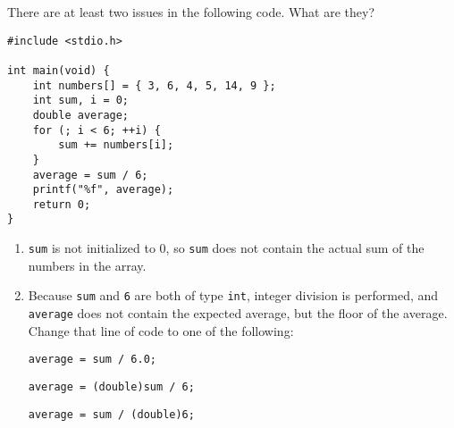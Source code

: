 There are at least two issues in the following code. What are they?

\begin{verbatim}
#include <stdio.h>

int main(void) {
    int numbers[] = { 3, 6, 4, 5, 14, 9 };
    int sum, i = 0;
    double average;
    for (; i < 6; ++i) {
        sum += numbers[i];
    }
    average = sum / 6;
    printf("%f", average);
    return 0;
}
\end{verbatim}

\begin{answer}
\begin{enumerate}
\item \texttt{sum} is not initialized to 0, so \texttt{sum} does not contain the actual sum of the numbers in the array.
\item Because \texttt{sum} and \texttt{6} are both of type \texttt{int}, integer division is performed, and \texttt{average} does not contain the expected average, but the floor of the average. Change that line of code to one of the following:
\begin{verbatim}
average = sum / 6.0;
\end{verbatim}
\begin{verbatim}
average = (double)sum / 6;
\end{verbatim}
\begin{verbatim}
average = sum / (double)6;
\end{verbatim}
\end{enumerate}
\end{answer}
